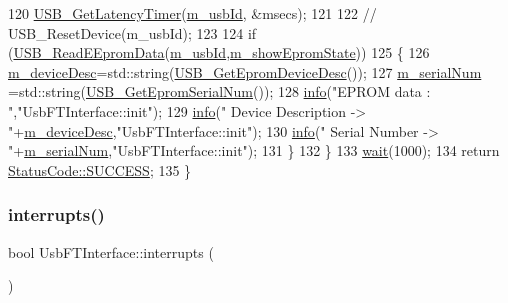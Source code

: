 \begin{DoxyCode}
120     \hyperlink{LALUsbML_8h_a90c0ec96b211bb1b45c4b26afe6f6ced}{USB\_GetLatencyTimer}(\hyperlink{classUsbFTInterface_a91df5c0547e8be460bc087e27afe05aa}{m\_usbId}, &msecs);
121 
122     \textcolor{comment}{//    USB\_ResetDevice(m\_usbId);}
123 
124     \textcolor{keywordflow}{if} (\hyperlink{LALUsbML_8h_a414627be9c52759e024fd350a62c6b42}{USB\_ReadEEpromData}(\hyperlink{classUsbFTInterface_a91df5c0547e8be460bc087e27afe05aa}{m\_usbId},\hyperlink{classUsbFTInterface_aa5c215777af41de94a2b371c59c88c7c}{m\_showEpromState}))
125     \{
126       \hyperlink{classUsbFTInterface_a500067688c32cdb3719fecf128e88dca}{m\_deviceDesc}=std::string(\hyperlink{LALUsbML_8h_a87e0b3814433c5f52c2ae12344cf7bc9}{USB\_GetEpromDeviceDesc}());
127       \hyperlink{classUsbFTInterface_a031610ca38939734ec7431d80f5f299f}{m\_serialNum} =std::string(\hyperlink{LALUsbML_8h_a69888cfc799086742988cef71c01124f}{USB\_GetEpromSerialNum}());
128       \hyperlink{classObject_a644fd329ea4cb85f54fa6846484b84a8}{info}(\textcolor{stringliteral}{"EPROM data : "},\textcolor{stringliteral}{"UsbFTInterface::init"});
129       \hyperlink{classObject_a644fd329ea4cb85f54fa6846484b84a8}{info}(\textcolor{stringliteral}{"  Device Description -> "}+\hyperlink{classUsbFTInterface_a500067688c32cdb3719fecf128e88dca}{m\_deviceDesc},\textcolor{stringliteral}{"UsbFTInterface::init"});
130       \hyperlink{classObject_a644fd329ea4cb85f54fa6846484b84a8}{info}(\textcolor{stringliteral}{"  Serial Number      -> "}+\hyperlink{classUsbFTInterface_a031610ca38939734ec7431d80f5f299f}{m\_serialNum},\textcolor{stringliteral}{"UsbFTInterface::init"});      
131     \}
132   \}
133   \hyperlink{Tools_8h_a74d6a3fc8194eaac3e1f888db0542be9}{wait}(1000);
134   \textcolor{keywordflow}{return} \hyperlink{classStatusCode_a6f565cbeadc76d14c72f047e5e85eb4badd0da38d3ba0d922efd1f4619bc37ad8}{StatusCode::SUCCESS};
135 \}
\end{DoxyCode}
\mbox{\label{classUsbFTInterface_a1831ba02d9707ded902af4cb1df8863f}} 
\subsubsection{\texorpdfstring{interrupts()}{interrupts()}}
{\footnotesize\ttfamily bool Usb\+F\+T\+Interface\+::interrupts (\begin{DoxyParamCaption}{ }\end{DoxyParamCaption})\hspace{0.3cm}{\ttfamily [inline]}}

